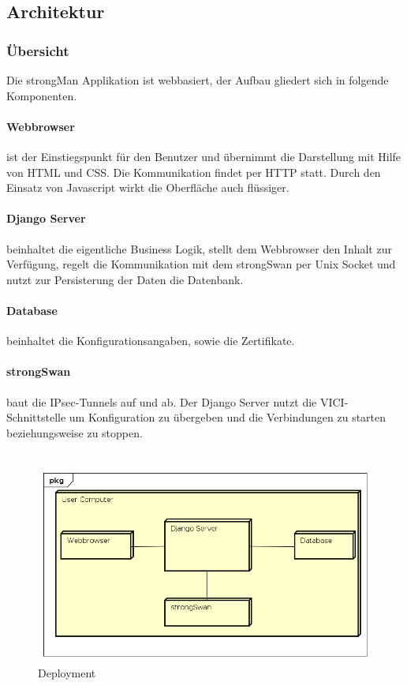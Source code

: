\subsection{Architektur}

\subsubsection{Übersicht}
Die strongMan Applikation ist webbasiert, der Aufbau gliedert sich in folgende Komponenten.

\paragraph{Webbrowser} ist der Einstiegspunkt für den Benutzer und übernimmt die Darstellung mit Hilfe von HTML und CSS. Die Kommunikation findet per HTTP statt. Durch den Einsatz von Javascript wirkt die Oberfläche auch flüssiger.

\paragraph{Django Server} beinhaltet die eigentliche Business Logik,  stellt dem Webbrowser den Inhalt zur Verfügung, regelt die Kommunikation mit dem strongSwan per Unix Socket und nutzt zur Persisterung der Daten die Datenbank.

\paragraph{Database} beinhaltet die Konfigurationsangaben, sowie die Zertifikate.

\paragraph{strongSwan} baut die IPsec-Tunnels auf und ab. Der Django Server nutzt die VICI-Schnittstelle um Konfiguration zu übergeben und die Verbindungen zu starten beziehungsweise zu stoppen. \\\\


\begin{figure}[H]
\centering
\includegraphics[width=360pt]{images/deployment.png}
\caption[Deployment]{Deployment}
\end{figure}

